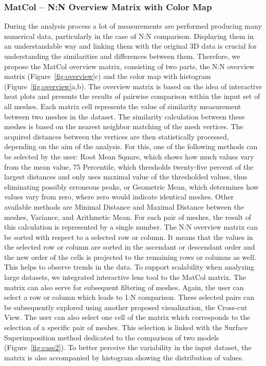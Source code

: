 \documentclass[final,5p,times]{elsarticle}
\begin{document}
\subsubsection{MatCol -- N:N Overview Matrix with Color Map}
During the analysis process a lot of measurements are performed producing many numerical data, particularly in the case of N:N comparison.
Displaying them in an understandable way and linking them with the original 3D data is crucial for understanding the similarities and differences between them.
Therefore, we propose the MatCol overview matrix, consisting of two parts, the N:N overview matrix (Figure~\ref{fig:overview}c) and the color map with histogram (Figure~\ref{fig:overview}a,b). 
The overview matrix is based on the idea of interactive heat plots and presents the results of pairwise comparison within the input set of all meshes.
Each matrix cell represents the value of similarity measurement between two meshes in the dataset.
The similarity calculation between these meshes is based on the nearest neighbor matching of the mesh vertices.
The acquired distances between the vertices are then statistically processed, depending on the aim of the analysis.
For this, one of the following methods can be selected by the user: Root Mean Square, which shows how much values vary from the mean value, 75 Percentile, which thresholds twenty-five percent of the largest distances and only uses maximal value of the thresholded values, thus eliminating possibly erroneous peaks, or Geometric Mean, which determines how values vary from zero, where zero would indicate identical meshes. 
Other available methods are Minimal Distance and Maximal Distance between the meshes, Variance, and Arithmetic Mean.
For each pair of meshes, the result of this calculation is represented by a single number.
The N:N overview matrix can be sorted with respect to a selected row or column.
It means that the values in the selected row or column are sorted in the ascendant or descendant order and the new order of the cells is projected to the remaining rows or columns as well.
This helps to observe trends in the data.
To support scalability when analyzing large datasets, we integrated interactive lens tool to the MatCol matrix.
The matrix can also serve for subsequent filtering of meshes.
Again, the user can select a row or column which leads to 1:N comparison.
These selected pairs can be subsequently explored using another proposed visualization, the Cross-cut View.
The user can also select one cell of the matrix which corresponds to the selection of a specific pair of meshes.
This selection is linked with the Surface Superimposition method dedicated to the comparison of two models (Figure~\ref{fig:case2}).
To better perceive the variability in the input dataset, the matrix is also accompanied by histogram showing the distribution of values.
\end{document}
